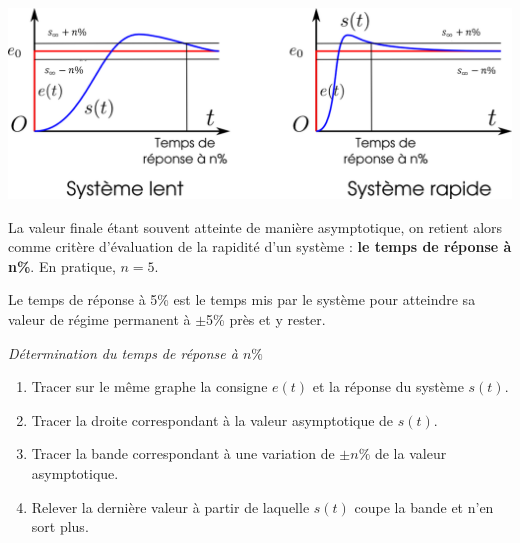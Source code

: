 \documentclass[11pt,oneside]{article}
\begin{document}
 \begin{center}
 \includegraphics[width=.8\textwidth]{png/rapidite}
 \end{center}

La valeur finale étant souvent atteinte de manière asymptotique, on retient
alors comme critère d'évaluation de la rapidité d'un système : \textbf{le temps
de réponse à n\%}. En pratique, $n=5$. 

Le temps de réponse à 5\% est le temps mis par le système pour atteindre sa
valeur de régime permanent à $\pm$5\% près et y rester. 


\begin{methode}
 \textit{\textsf{Détermination du temps de réponse à $n\%$}}

\begin{enumerate}
 \item Tracer sur le même graphe la consigne $e(t)$ et la réponse du système
$s(t)$.
\item Tracer la droite correspondant à la valeur asymptotique de $s(t)$.
\item Tracer la bande correspondant à une variation de $\pm n\%$ de la valeur
asymptotique.
\item Relever la dernière valeur à partir de laquelle $s(t)$ coupe la bande et
n'en sort plus.
\end{enumerate}
\end{methode}

\end{document}
